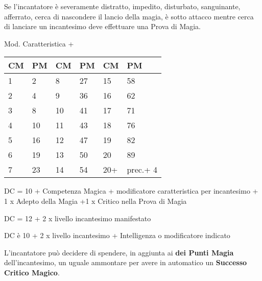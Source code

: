 \documentclass[landscape,10pt,a4paper]{article}
\begin{document}
\begin{multicols}{2}
\begin{dmbox}[title=Distratto - pagina \pageref{magiedistratto}]
Se l'incantatore è severamente distratto, impedito, disturbato, sanguinante, afferrato, cerca di nascondere il lancio della magia, è sotto attacco mentre cerca di lanciare un incantesimo deve effettuare una Prova di Magia.
\end{dmbox}


\begin{dmbox}[title=Punti Magia - pagina \pageref{magiepuntimagia}]

Mod. Caratteristica + \\

\noindent\begin{tabularx}{0.45\textwidth}{XX|XX|XX}
\textbf{CM} & \textbf{PM}&\textbf{CM} & \textbf{PM}&\textbf{CM} & \textbf{PM}\\
\hline
1&2 &8&27&15&58\\
2&4&9&36&16&62\\
3&8&10&41&17&71\\
4&10&11&43&18&76\\
5&16&12&47&19&82\\
6&19&13&50&20&89\\
7&23&14&54&20+&prec.+ 4
\end{tabularx}

\end{dmbox}


\begin{dmbox}[title=Tiro Salvezza Incantesimo - pagina \pageref{magietirosalvezza}]
DC = 10 + Competenza Magica + modificatore caratteristica per incantesimo + 1 x Adepto della Magia +1 x Critico nella Prova di Magia
\end{dmbox}


\begin{dmbox}[title=Tiro Salvezza Magia da Oggetto - pagina \pageref{tirosalvezzaincoggetto}]
DC = 12 + 2 x livello incantesimo manifestato
\end{dmbox}

\begin{dmbox}[title=Tiro Salvezza Incantesimo Mostro - pagina \pageref{tirosalvezzainccmostro}]
DC è 10 + 2 x livello incantesimo + Intelligenza o modificatore indicato
\end{dmbox}

\begin{dmbox}[title=Successo Critico Auto Magico - pagina \pageref{magienova}]
L'incantatore può decidere di spendere, in aggiunta ai \textbf{dei Punti Magia} dell'incantesimo, un uguale ammontare per avere in automatico un \textbf{Successo Critico Magico}.


\end{dmbox}
\end{multicols}
\end{document}
